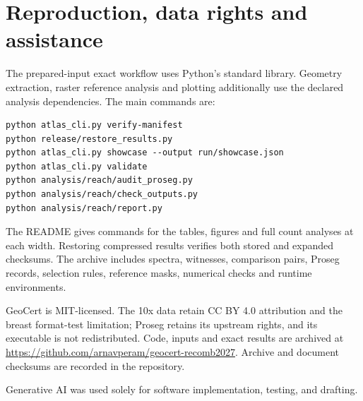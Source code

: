 \documentclass[10pt,letterpaper]{article}
\begin{document}
\clearpage

\FloatBarrier
\section{Reproduction, data rights and assistance}
The prepared-input exact workflow uses Python's standard library. Geometry extraction, raster reference analysis and plotting additionally use the declared analysis dependencies. The main commands are:
\begin{verbatim}
python atlas_cli.py verify-manifest
python release/restore_results.py
python atlas_cli.py showcase --output run/showcase.json
python atlas_cli.py validate
python analysis/reach/audit_proseg.py
python analysis/reach/check_outputs.py
python analysis/reach/report.py
\end{verbatim}
The README gives commands for the tables, figures and full count analyses at each width. Restoring compressed results verifies both stored and expanded checksums. The archive includes spectra, witnesses, comparison pairs, Proseg records, selection rules, reference masks, numerical checks and runtime environments.

GeoCert is MIT-licensed. The 10x data retain CC BY 4.0 attribution and the breast format-test limitation; Proseg retains its upstream rights, and its executable is not redistributed. Code, inputs and exact results are archived at \url{https://github.com/arnavperam/geocert-recomb2027}. Archive and document checksums are recorded in the repository.

Generative AI was used solely for software implementation, testing, and drafting.
\FloatBarrier

\end{document}
